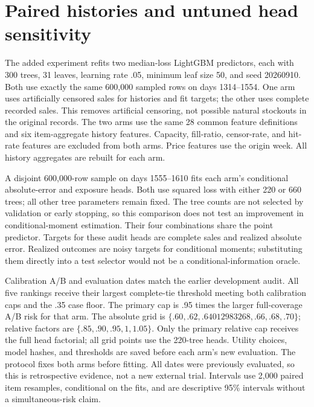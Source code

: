 \section{Paired histories and untuned head sensitivity}\label{app:matched}
The added experiment refits two median-loss LightGBM predictors, each with 300 trees, 31 leaves, learning rate .05, minimum leaf size 50, and seed 20260910. Both use exactly the same 600,000 sampled rows on days 1314--1554. One arm uses artificially censored sales for histories and fit targets; the other uses complete recorded sales. This removes artificial censoring, not possible natural stockouts in the original records. The two arms use the same 28 common feature definitions and six item-aggregate history features. Capacity, fill-ratio, censor-rate, and hit-rate features are excluded from both arms. Price features use the origin week. All history aggregates are rebuilt for each arm.

A disjoint 600,000-row sample on days 1555--1610 fits each arm's conditional absolute-error and exposure heads. Both use squared loss with either 220 or 660 trees; all other tree parameters remain fixed. The tree counts are not selected by validation or early stopping, so this comparison does not test an improvement in conditional-moment estimation. Their four combinations share the point predictor. Targets for these audit heads are complete sales and realized absolute error. Realized outcomes are noisy targets for conditional moments; substituting them directly into a test selector would not be a conditional-information oracle.

Calibration A/B and evaluation dates match the earlier development audit. All five rankings receive their largest complete-tie threshold meeting both calibration caps and the .35 case floor. The primary cap is .95 times the larger full-coverage A/B risk for that arm. The absolute grid is $\{.60,.62,.64012983268,.66,.68,.70\}$; relative factors are $\{.85,.90,.95,1,1.05\}$. Only the primary relative cap receives the full head factorial; all grid points use the 220-tree heads. Utility choices, model hashes, and thresholds are saved before each arm's new evaluation. The protocol fixes both arms before fitting. All dates were previously evaluated, so this is retrospective evidence, not a new external trial. Intervals use 2,000 paired item resamples, conditional on the fits, and are descriptive 95\% intervals without a simultaneous-risk claim.




